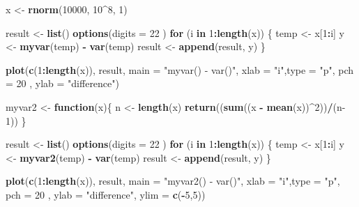 \documentclass[
]{article}
\newenvironment{Shaded}{\begin{snugshade}}{\end{snugshade}}
\newcommand{\ControlFlowTok}[1]{\textcolor[rgb]{0.13,0.29,0.53}{\textbf{#1}}}
\newcommand{\DataTypeTok}[1]{\textcolor[rgb]{0.13,0.29,0.53}{#1}}
\newcommand{\DecValTok}[1]{\textcolor[rgb]{0.00,0.00,0.81}{#1}}
\newcommand{\KeywordTok}[1]{\textcolor[rgb]{0.13,0.29,0.53}{\textbf{#1}}}
\newcommand{\NormalTok}[1]{#1}
\newcommand{\OperatorTok}[1]{\textcolor[rgb]{0.81,0.36,0.00}{\textbf{#1}}}
\newcommand{\StringTok}[1]{\textcolor[rgb]{0.31,0.60,0.02}{#1}}
\begin{document}
\begin{Shaded}
\begin{Highlighting}[]
\NormalTok{x <-}\StringTok{ }\KeywordTok{rnorm}\NormalTok{(}\DecValTok{10000}\NormalTok{, }\DecValTok{10}\OperatorTok{^}\DecValTok{8}\NormalTok{, }\DecValTok{1}\NormalTok{)}

\NormalTok{result <-}\StringTok{ }\KeywordTok{list}\NormalTok{()}
\KeywordTok{options}\NormalTok{(}\DataTypeTok{digits =} \DecValTok{22}\NormalTok{ )}
\ControlFlowTok{for}\NormalTok{ (i }\ControlFlowTok{in} \DecValTok{1}\OperatorTok{:}\KeywordTok{length}\NormalTok{(x)) \{}
\NormalTok{  temp <-}\StringTok{ }\NormalTok{x[}\DecValTok{1}\OperatorTok{:}\NormalTok{i]}
\NormalTok{  y <-}\StringTok{ }\KeywordTok{myvar}\NormalTok{(temp) }\OperatorTok{-}\StringTok{ }\KeywordTok{var}\NormalTok{(temp)}
\NormalTok{  result <-}\StringTok{ }\KeywordTok{append}\NormalTok{(result, y)}
\NormalTok{\}}

\KeywordTok{plot}\NormalTok{(}\KeywordTok{c}\NormalTok{(}\DecValTok{1}\OperatorTok{:}\KeywordTok{length}\NormalTok{(x)), result, }\DataTypeTok{main =} \StringTok{"myvar() - var()"}\NormalTok{,}
     \DataTypeTok{xlab =} \StringTok{"i"}\NormalTok{,}\DataTypeTok{type =} \StringTok{"p"}\NormalTok{,  }\DataTypeTok{pch =} \DecValTok{20}\NormalTok{ , }\DataTypeTok{ylab =} \StringTok{"difference"}\NormalTok{)}

\NormalTok{myvar2 <-}\StringTok{ }\ControlFlowTok{function}\NormalTok{(x)\{}
\NormalTok{  n <-}\StringTok{ }\KeywordTok{length}\NormalTok{(x)}
  \KeywordTok{return}\NormalTok{((}\KeywordTok{sum}\NormalTok{((x }\OperatorTok{-}\StringTok{ }\KeywordTok{mean}\NormalTok{(x))}\OperatorTok{^}\DecValTok{2}\NormalTok{))}\OperatorTok{/}\NormalTok{(n}\DecValTok{-1}\NormalTok{))}
\NormalTok{\}}

\NormalTok{result <-}\StringTok{ }\KeywordTok{list}\NormalTok{()}
\KeywordTok{options}\NormalTok{(}\DataTypeTok{digits =} \DecValTok{22}\NormalTok{ )}
\ControlFlowTok{for}\NormalTok{ (i }\ControlFlowTok{in} \DecValTok{1}\OperatorTok{:}\KeywordTok{length}\NormalTok{(x)) \{}
\NormalTok{  temp <-}\StringTok{ }\NormalTok{x[}\DecValTok{1}\OperatorTok{:}\NormalTok{i]}
\NormalTok{  y <-}\StringTok{ }\KeywordTok{myvar2}\NormalTok{(temp) }\OperatorTok{-}\StringTok{ }\KeywordTok{var}\NormalTok{(temp)}
\NormalTok{  result <-}\StringTok{ }\KeywordTok{append}\NormalTok{(result, y)}
\NormalTok{\}}

\KeywordTok{plot}\NormalTok{(}\KeywordTok{c}\NormalTok{(}\DecValTok{1}\OperatorTok{:}\KeywordTok{length}\NormalTok{(x)), result, }\DataTypeTok{main =} \StringTok{"myvar2() - var()"}\NormalTok{, }\DataTypeTok{xlab =} \StringTok{"i"}\NormalTok{,}\DataTypeTok{type =} \StringTok{"p"}\NormalTok{,}
     \DataTypeTok{pch =} \DecValTok{20}\NormalTok{ , }\DataTypeTok{ylab =} \StringTok{"difference"}\NormalTok{, }\DataTypeTok{ylim =} \KeywordTok{c}\NormalTok{(}\OperatorTok{-}\DecValTok{5}\NormalTok{,}\DecValTok{5}\NormalTok{))}


\end{Highlighting}
\end{Shaded}
\end{document}
